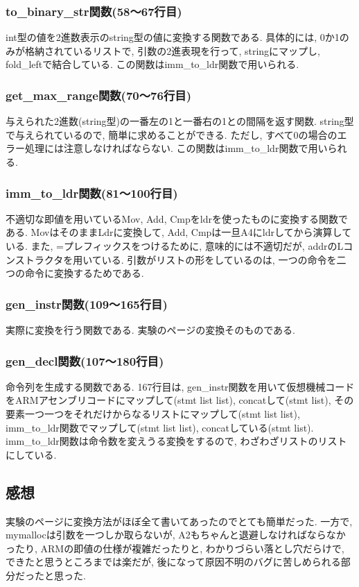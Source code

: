 \documentclass{jarticle}
\begin{document}
\subsubsection{to\_binary\_str関数(58～67行目)}
int型の値を2進数表示のstring型の値に変換する関数である. 具体的には, 0か1のみが格納されているリストで, 引数の2進表現を行って, stringにマップし, fold\_leftで結合している. この関数はimm\_to\_ldr関数で用いられる.
\subsubsection{get\_max\_range関数(70～76行目)}
与えられた2進数(string型)の一番左の1と一番右の1との間隔を返す関数. string型で与えられているので, 簡単に求めることができる. ただし, すべて0の場合のエラー処理には注意しなければならない. この関数はimm\_to\_ldr関数で用いられる.
\subsubsection{imm\_to\_ldr関数(81～100行目)}
不適切な即値を用いているMov, Add, Cmpをldrを使ったものに変換する関数である. MovはそのままLdrに変換して, Add, Cmpは一旦A4にldrしてから演算している. また, =プレフィックスをつけるために, 意味的には不適切だが, addrのLコンストラクタを用いている. 引数がリストの形をしているのは, 一つの命令を二つの命令に変換するためである.
\subsubsection{gen\_instr関数(109～165行目)}
実際に変換を行う関数である. 実験のページの変換そのものである.
\subsubsection{gen\_decl関数(107～180行目)}
命令列を生成する関数である. 167行目は, gen\_instr関数を用いて仮想機械コードをARMアセンブリコードにマップして(stmt list list), concatして(stmt list), その要素一つ一つをそれだけからなるリストにマップして(stmt list list), imm\_to\_ldr関数でマップして(stmt list list), concatしている(stmt list). imm\_to\_ldr関数は命令数を変えうる変換をするので, わざわざリストのリストにしている.
\subsection{感想}
実験のページに変換方法がほぼ全て書いてあったのでとても簡単だった. 一方で, mymallocは引数を一つしか取らないが, A2もちゃんと退避しなければならなかったり, ARMの即値の仕様が複雑だったりと, わかりづらい落とし穴だらけで, できたと思うところまでは楽だが, 後になって原因不明のバグに苦しめられる部分だったと思った.
\end{document}
